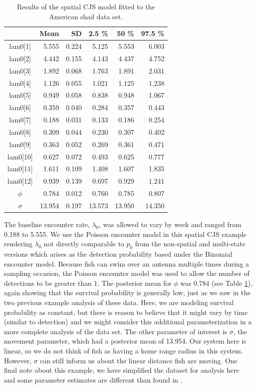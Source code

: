 \begin{table}
\centering
\caption{
Results of the spatial CJS model fitted to the
American shad data set.
}
\begin{tabular}{crrrrr}
\hline \hline
&       Mean   &  SD  &  2.5 \%   &   50 \%    &  97.5 \% \\
\hline
lam0[1] &  5.555& 0.224  & 5.125 & 5.553 	& 6.003 \\
lam0[2] &  4.442& 0.155  & 4.143 & 4.437  & 4.752 \\
lam0[3] &  1.892& 0.068  & 1.763 & 1.891  & 2.031 \\
lam0[4] &  1.126& 0.055  & 1.021 & 1.125  & 1.238 \\
lam0[5] &  0.949& 0.058  & 0.838 & 0.948 & 1.067 \\
lam0[6] &  0.359& 0.040  & 0.284 & 0.357 & 0.443 \\
lam0[7] &  0.188& 0.031  & 0.133 & 0.186 &  0.254 \\
lam0[8] &  0.309 &0.044  & 0.230  & 0.307  & 0.402 \\
lam0[9]  & 0.363 &0.052 &  0.269 &  0.361 & 0.471 \\
lam0[10] & 0.627 &0.072  & 0.493  & 0.625  & 0.777 \\
lam0[11] & 1.611 &0.109  & 1.408  & 1.607  & 1.835 \\
lam0[12] & 0.939 &0.139 & 0.697  & 0.929  & 1.241 \\
$\phi$  &  0.784 &0.012  & 0.760  & 0.785  & 0.807 \\
$\sigma$ & 13.954& 0.197  & 13.573 & 13.950  & 14.350\\

\hline
\end{tabular}
\label{open.tab.shad1}
\end{table}

The baseline encounter rate, $\lambda_0$, was allowed to vary by week and ranged from 0.188 to 5.555.
We use the Poisson encounter model in this spatial CJS example rendering  $\lambda_0$ not directly
comparable to $p_0$ from the non-spatial and multi-state versions which arises as the detection probability
based under the Binomial encounter model.  Because fish can swim over an antenna multiple times during
a sampling occasion, the Poisson encounter model was used to allow the number of detections to be greater
than 1.
The
posterior mean for $\phi$ was 0.784 (see Table \ref{open.tab.shad1}), again showing that the
survival probability is generally low, just as we saw in the two previous example analysis of these data.
Here, we are modeling survival probability as constant, but there is reason to believe that it might vary by
time (similar to detection) and we might consider this additional parameterization in a more
complete analysis of the data set. The
other parameter of interest is $\sigma$, the movement parameter, which had a posterior mean of 13.954.  Our
system here is linear, so we do not think of fish as having a home
range radius in this system.  However, $\sigma$ can still inform us
about the linear distance fish are moving.   One final note about this example, we have simplified the
dataset for analysis here and some parameter estimates are different than found in
\cite{raabe_diss:2012}.

